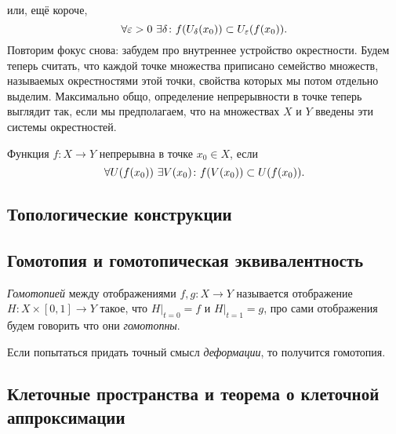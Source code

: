 или, ещё короче,
	\begin{equation}
		\forall\varepsilon>0\ \exists\delta\colon f(U_{\delta}(x_0))\subset U_{\varepsilon}(f(x_0)).
	\end{equation}
Повторим фокус снова: забудем про внутреннее устройство окрестности. Будем теперь считать, что каждой точке множества приписано семейство множеств, называемых окрестностями этой точки, свойства которых мы потом отдельно выделим. Максимально общо, определение непрерывности в точке теперь выглядит так, если мы предполагаем, что на множествах $X$ и $Y$ введены эти системы окрестностей.
\begin{defin}
	Функция $f\colon X\to Y$ непрерывна в точке $x_0\in X$, если
	\begin{equation}
		\forall U(f(x_0))\ \exists V(x_0)\colon f(V(x_0))\subset U(f(x_0)).
	\end{equation}
\end{defin}

\subsection{Топологические конструкции}




\subsection{Гомотопия и гомотопическая эквивалентность}
\begin{defin}
	\textit{Гомотопией} между отображениями $f,g\colon X\to Y$ называется отображение $H\colon X\times[0,1]\to Y$ такое, что $H|_{t=0}=f$ и $H|_{t=1}=g$, про сами отображения будем говорить что они \textit{гомотопны}.
\end{defin}
Если попытаться придать точный смысл \textit{деформации}, то получится гомотопия. 

\subsection{Клеточные пространства и теорема о клеточной аппроксимации}

